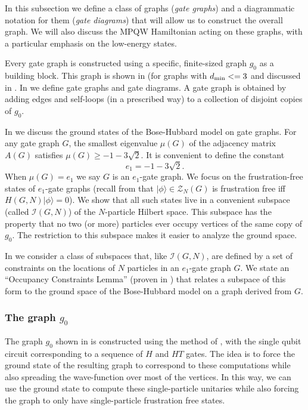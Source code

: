 \documentclass[../thesis-main/thesis-main]{subfiles}
\begin{document}
In this subsection we define a class of graphs (\emph{gate graphs}) and a diagrammatic notation for them (\emph{gate diagrams}) that will allow us to construct the overall graph. We will also discuss the MPQW Hamiltonian acting on these graphs, with a particular emphasis on the low-energy states.

Every gate graph is constructed using a specific, finite-sized graph $g_{0}$ as a building block. This graph is shown in  (for graphs with $d_{\text{min}} <= 3$ and discussed in . In  we define gate graphs and gate diagrams. A gate graph is obtained by adding edges and self-loops (in a prescribed way) to a collection of disjoint copies of $g_{0}$.


In  we discuss the ground states of the Bose-Hubbard model on gate graphs. For any gate graph $G$, the smallest eigenvalue $\mu(G)$ of the adjacency matrix $A(G)$ satisfies $\mu(G)\geq-1-3\sqrt{2}$. It is convenient to define the constant
\begin{equation}
e_{1}=-1-3\sqrt{2}.\label{eq:e1_defn}
\end{equation}
When $\mu(G)=e_{1}$ we say $G$ is an $e_{1}$-gate graph. We focus on the frustration-free states of $e_1$-gate graphs (recall from  that $|\phi\rangle\in \mathcal{Z}_N(G)$ is frustration free iff $H(G,N)|\phi\rangle=0$). We show that all such states live in a convenient subspace (called $\mathcal{I}(G,N)$) of the $N$-particle Hilbert space. This subspace has the property that no two (or more) particles ever occupy vertices of the same copy of $g_{0}$. The restriction to this subspace makes it easier to analyze the ground space.

In  we consider a class of subspaces that, like $\mathcal{I}(G,N)$, are defined by a set of constraints on the locations of $N$ particles in an $e_{1}$-gate graph $G$. We state an ``Occupancy Constraints Lemma'' (proven in ) that relates a subspace of this form to the ground space of the Bose-Hubbard model on a graph derived from $G$.


\subsubsection{The graph $g_0$}

The graph $g_{0}$ shown in  is constructed using the method of , with the single qubit circuit corresponding to a sequence of $H$ and $HT$ gates.  The idea is to force the ground state of the resulting graph to correspond to these computations while also spreading the wave-function over most of the vertices.  In this way, we can use the ground state to compute these single-particle unitaries while also forcing the graph to only have single-particle frustration free states.
\end{document}

